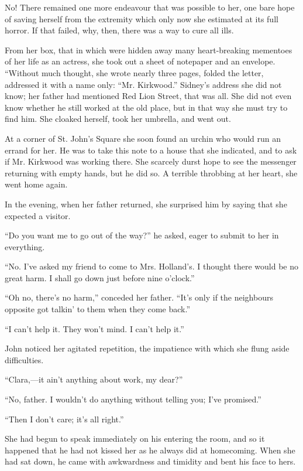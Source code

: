 No! There remained one more endeavour that was possible to her, one bare
hope of saving herself from the extremity which only now she estimated
at its full horror. If that failed, why, then, there was a way to cure
all ills.

From her box, that in which were hidden away many heart-breaking
mementoes of her life as an actress, she took out a sheet of {}notepaper
and an envelope. ``Without much thought, she wrote nearly three pages,
folded the letter, addressed it with a name only: ``Mr. Kirkwood.''
Sidney's address she did not know; her father had mentioned Red Lion
Street, that was all. She did not even know whether he still worked at
the old place, but in that way she must try to find him. She cloaked
herself, took her umbrella, and went out.

At a corner of St. John's Square she soon found an urchin who would run
an errand for her. He was to take this note to a house that she
indicated, and to ask if Mr. Kirkwood was working there. She scarcely
durst hope to see the messenger returning with empty hands, but he did
so. A terrible throbbing at her heart, she went home again.

In the evening, when her father returned, she surprised him by saying
that she expected a visitor.

``Do you want me to go out of the way?'' he asked, eager to submit to
her in everything.

``No. I've asked my friend to come to Mrs. Holland's. I thought there
would be no great harm. I shall go down just before nine o'clock.''

``Oh no, there's no harm,'' conceded her {}father. ``It's only if the
neighbours opposite got talkin' to them when they come back.''

``I can't help it. They won't mind. I can't help it.''

John noticed her agitated repetition, the impatience with which she
flung aside difficulties.

``Clara,---it ain't anything about work, my dear?''

``No, father. I wouldn't do anything without telling you; I've
promised.''

``Then I don't care; it's all right.''

She had begun to speak immediately on his entering the room, and so it
happened that he had not kissed her as he always did at homecoming. When
she had sat down, he came with awkwardness and timidity and bent his
face to hers.

